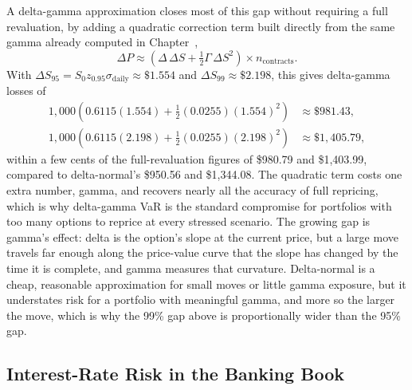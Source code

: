 \documentclass[../ai_in_finance]{subfiles}
\begin{document}
A delta-gamma approximation closes most of this gap without requiring a full revaluation, by adding a quadratic correction term built directly from the same gamma already computed in Chapter~,
\begin{equation}
\label{eq:marketrisk-delta-gamma}
\Delta P \approx \left(\Delta \, \Delta S + \tfrac{1}{2}\Gamma \, \Delta S^2\right) \times n_{\text{contracts}}.
\end{equation}
With $\Delta S_{95} = S_0 z_{0.95}\sigma_{\text{daily}} \approx \$1.554$ and $\Delta S_{99} \approx \$2.198$, this gives delta-gamma losses of
\begin{align*}
1{,}000\left(0.6115(1.554) + \tfrac{1}{2}(0.0255)(1.554)^2\right) &\approx \$981.43, \\
1{,}000\left(0.6115(2.198) + \tfrac{1}{2}(0.0255)(2.198)^2\right) &\approx \$1{,}405.79,
\end{align*}
within a few cents of the full-revaluation figures of \$980.79 and \$1,403.99, compared to delta-normal's \$950.56 and \$1,344.08. The quadratic term costs one extra number, gamma, and recovers nearly all the accuracy of full repricing, which is why delta-gamma VaR is the standard compromise for portfolios with too many options to reprice at every stressed scenario.
The growing gap is gamma's effect: delta is the option's slope at the current price, but a large move travels far enough along the price-value curve that the slope has changed by the time it is complete, and gamma measures that curvature.
Delta-normal is a cheap, reasonable approximation for small moves or little gamma exposure, but it understates risk for a portfolio with meaningful gamma, and more so the larger the move, which is why the 99\% gap above is proportionally wider than the 95\% gap.

\subsection{Interest-Rate Risk in the Banking Book}
\label{sec:irrbb}
\end{document}
